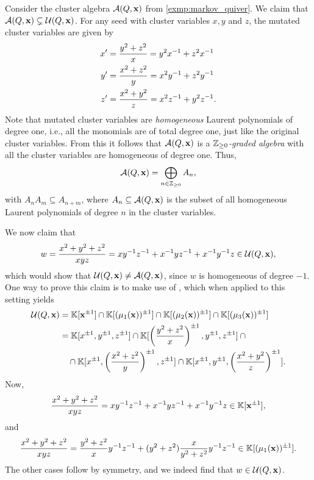 \begin{example}
	Consider the cluster algebra $\mathcal{A}(Q, \mathbf{x})$ from \cref{exmp:markov_quiver}. We claim that $\mathcal{A}(Q, \mathbf{x}) \subsetneq \mathcal{U}(Q, \mathbf{x})$. For any seed with cluster variables $x,y$ and $z$, the mutated cluster variables are given by
	\begin{align*}
		x' & = \frac{y^2 + z^2}{x} = y^2 x^{-1} + z^2 x^{-1}  \\
		y' & = \frac{x^2 + z^2}{y} = x^2 y^{-1} + z^2 y^{-1}  \\
		z' & = \frac{x^2 + y^2}{z} = x^2 z^{-1} + y^2 z^{-1}.
	\end{align*}
	Note that mutated cluster variables are
	\emph{homogeneous} Laurent polynomials of degree one,
	i.e., all the monomials are of total degree one, just like the original cluster
	variables. From this it follows that $\mathcal{A}(Q, \mathbf{x})$ is a $\mathbb{Z}_{\geq 0}$\emph{-graded
		algebra} with all the cluster variables are homogeneous of degree
	one. Thus,
	\begin{equation*}
		\mathcal{A}(Q, \mathbf{x}) = \bigoplus_{n \in \mathbb{Z}_{\geq 0}} A_n,
	\end{equation*}
	with $A_n A_m \subseteq A_{n+m}$, where $A_n \subseteq \mathcal{A}(Q, \mathbf{x})$ is the subset of
	all homogeneous Laurent polynomials of degree $n$ in the cluster variables.

	We now claim that
	\begin{equation*}
		w = \frac{x^2 + y^2 + z^2}{xyz} = xy^{-1} z^{-1}+ x^{-1} y z^{-1} + x^{-1} y ^{-1} z \in \mathcal{U}(Q, \mathbf{x}),
	\end{equation*}
	which would show that $\mathcal{U}(Q, \mathbf{x}) \neq \mathcal{A}(Q, \mathbf{x})$, since $w$ is homogeneous of
	degree $-1$. One way to prove this claim is to make use of \cite[Corollary
		1.7]{BerensteinFominZelevinsky2005CA3UpperBoundsDBC}, which when applied to this
	setting yields
	\begin{align*}
		\mathcal{U}(Q, \mathbf{x})
		 & = \mathbb{K}[\mathbf{x}^{\pm 1}] \cap \mathbb{K}[(\mu_1(\mathbf{x}))^{\pm 1}] \cap \mathbb{K}[(\mu_2(\mathbf{x}))^{\pm 1}] \cap \mathbb{K}[(\mu_3(\mathbf{x}))^{\pm 1}]                                       \\
		 & =
		\mathbb{K}[x^{\pm 1}, y^{\pm 1}, z^{\pm 1}] \cap \mathbb{K}[\left(\frac{y^2 + z^2}{x}\right)^{\pm 1}, y^{\pm 1}, z^{\pm 1}] \cap {}                                      \\
		 & \quad {}\cap\mathbb{K}[x^{\pm 1}, \left(\frac{x^2 + z^2}{y}\right)^{\pm 1}, z^{\pm 1}]\cap \mathbb{K}[x^{\pm 1},y^{\pm 1}, \left(\frac{x^2 + y^2}{z}\right)^{\pm 1}].
	\end{align*}
	Now,
	\begin{equation*}
		\frac{x^2 + y^2 + z^2}{xyz} = xy^{-1} z^{-1}+ x^{-1} y z^{-1} + x^{-1} y ^{-1} z \in \mathbb{K}[\mathbf{x}^{\pm 1}],
	\end{equation*}
	and
	\begin{equation*}
		\frac{x^2 + y^2 + z^2}{xyz} = \frac{y^2 + z^2}{x}y^{-1} z^{-1} + (y^2  + z^2)\frac{x}{y^2 + z^2}y ^{-1} z ^{-1} \in \mathbb{K}[(\mu_1(\mathbf{x}))^{\pm 1}].
	\end{equation*}
	The other cases follow by symmetry, and we indeed find that $w \in \mathcal{U}(Q, \mathbf{x})$.


\end{example}
